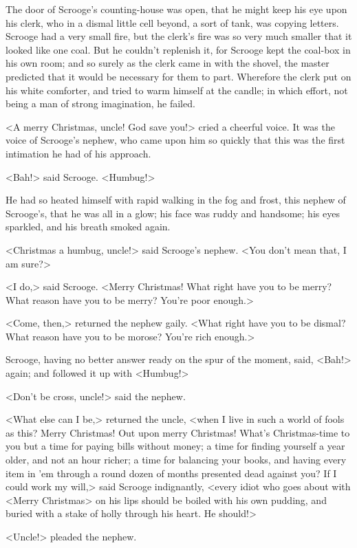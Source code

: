 The door of Scrooge's counting-house was open, that he might keep his eye upon
his clerk, who in a dismal little cell beyond, a sort of tank, was copying
letters. Scrooge had a very small fire, but the clerk's fire was so very much
smaller that it looked like one coal. But he couldn't replenish it, for Scrooge
kept the coal-box in his own room; and so surely as the clerk came in with the
shovel, the master predicted that it would be necessary for them to part.
Wherefore the clerk put on his white comforter, and tried to warm himself at the
candle; in which effort, not being a man of strong imagination, he failed.

<A merry Christmas, uncle! God save you!> cried a cheerful voice. It was the
voice of Scrooge's nephew, who came upon him so quickly that this was the first
intimation he had of his approach.

<Bah!> said Scrooge. <Humbug!>

He had so heated himself with rapid walking in the fog and frost, this nephew of
Scrooge's, that he was all in a glow; his face was ruddy and handsome; his eyes
sparkled, and his breath smoked again.

<Christmas a humbug, uncle!> said Scrooge's nephew. <You don't mean that, I am
sure?>

<I do,> said Scrooge. <Merry Christmas! What right have you to be merry? What
reason have you to be merry? You're poor enough.>

<Come, then,> returned the nephew gaily. <What right have you to be dismal? What
reason have you to be morose? You're rich enough.>

Scrooge, having no better answer ready on the spur of the moment, said, <Bah!>
again; and followed it up with <Humbug!>

<Don't be cross, uncle!> said the nephew.

<What else can I be,> returned the uncle, <when I live in such a world of fools
as this? Merry Christmas! Out upon merry Christmas! What's Christmas-time to you
but a time for paying bills without money; a time for finding yourself a year
older, and not an hour richer; a time for balancing your books, and having every
item in 'em through a round dozen of months presented dead against you? If I
could work my will,> said Scrooge indignantly, <every idiot who goes about with
<Merry Christmas> on his lips should be boiled with his own pudding, and buried
with a stake of holly through his heart. He should!>

<Uncle!> pleaded the nephew.

